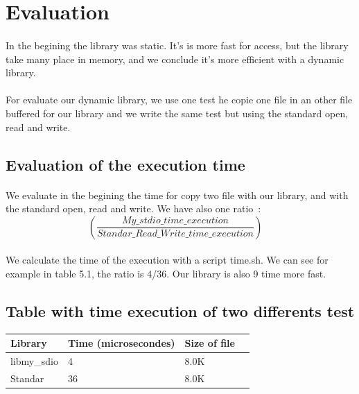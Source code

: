 \documentclass[a4paper,10pt]{article}
\begin{document}
\section{Evaluation}
\paragraph{}
In the begining the library was static. It's is more fast for access, but 
the library take many place in memory, and we conclude it's more efficient
with a dynamic library. 
\paragraph{}
For evaluate our dynamic library, we use one test he copie one file in an
other file buffered for our library and we write the same test 
but using the standard open, read and write.
\subsection{Evaluation of the execution time}
\paragraph{}
We evaluate in the begining the time for copy two file with our library, 
and with the standard open, read and write. We have also one ratio~: 
\begin{equation}
\left(\frac{My\_stdio\_time\_execution}{Standar\_Read\_Write\_time\_execution} \right)  \quad
\end{equation}
\paragraph{}
We calculate the time of the execution with a script time.sh. We can see
for example in table 5.1, the ratio is 4/36. Our library is also 9 time
more fast. 
\subsection{Table with time execution of two differents test}
\begin{tabular}{|R{2cm}|C{2cm}|L{1.5cm}|L{1.5cm}|}
\hline {}Library & Time (microsecondes) & Size of file\\
\hline  libmy\_sdio & 4 & 8.0K \\
\hline  Standar  & 36 & 8.0K \\
\hline 
\end{tabular}
\end{document}
